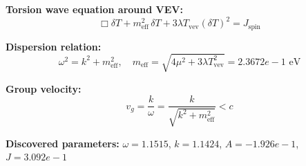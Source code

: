 
\textbf{Torsion wave equation around VEV:}
\begin{equation}
  \Box \delta T + m_{\text{eff}}^2 \, \delta T + 3\lambda T_{\text{vev}} (\delta T)^2 = J_{\text{spin}}
\end{equation}

\textbf{Dispersion relation:}
\begin{equation}
  \omega^2 = k^2 + m_{\text{eff}}^2, \quad
  m_{\text{eff}} = \sqrt{4\mu^2 + 3\lambda T_{\text{vev}}^2} = 2.3672e-1 \text{ eV}
\end{equation}

\textbf{Group velocity:}
\begin{equation}
  v_g = \frac{k}{\omega} = \frac{k}{\sqrt{k^2 + m_{\text{eff}}^2}} < c
\end{equation}

\textbf{Discovered parameters:}
$\omega = 1.1515$, \quad
$k = 1.1424$, \quad
$A = -1.926e-1$, \quad
$J = 3.092e-1$